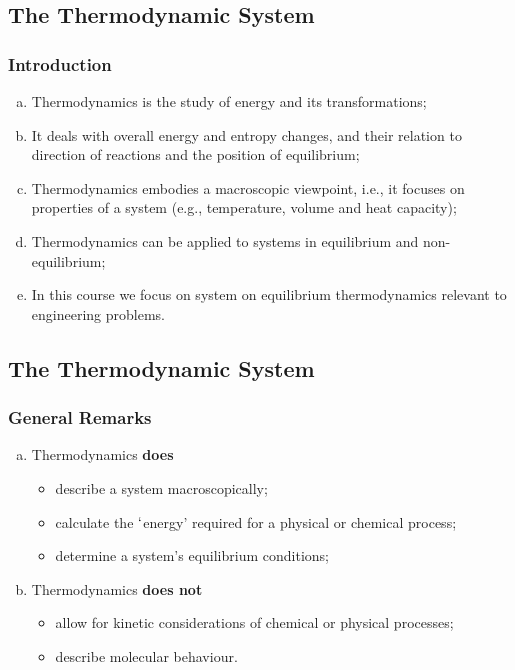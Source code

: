 \documentclass[10pt,compress]{beamer}
\begin{document}
\subsection{The Thermodynamic System}
\begin{frame}
 \frametitle{Introduction}
  \begin{enumerate}[(a)]
   \item <2-> Thermodynamics is the study of energy and its transformations;
   \item <3-> It deals with overall energy and entropy changes, and their relation to direction of reactions and the position of equilibrium;
   \item <4-> Thermodynamics embodies a macroscopic viewpoint, i.e., it focuses on properties of a system (e.g., temperature, volume and heat capacity);
   \item <5-> Thermodynamics can be applied to systems in equilibrium and non-equilibrium;
   \item <6-> In this course we focus on system on equilibrium thermodynamics relevant to engineering problems.   
  \end{enumerate}
\end{frame}


\subsection{The Thermodynamic System}
\begin{frame}
 \frametitle{General Remarks}
  \begin{enumerate}[(a)]
   \item <1-> Thermodynamics {\bf does}
     \begin{itemize}
       \item<1-> describe a system macroscopically;
       \item<1-> calculate the $\lq$energy' required for a physical or chemical process;
       \item<1-> determine a system's equilibrium conditions;
     \end{itemize}
   \item<2-> Thermodynamics {\bf does not}
     \begin{itemize}
       \item<2-> allow for kinetic considerations of chemical or physical processes;
       \item<2-> describe molecular behaviour.
     \end{itemize}
  \end{enumerate}
\end{frame}
\end{document}
